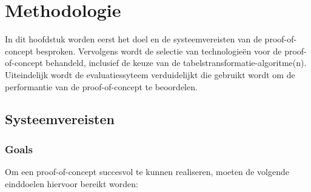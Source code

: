 
\chapter{Methodologie}
\label{ch:methodologie}


In dit hoofdstuk worden eerst het doel en de systeemvereisten van de proof-of-concept besproken. Vervolgens wordt de selectie van technologieën voor de proof-of-concept behandeld, inclusief de keuze van de tabelstransformatie-algoritme(n). Uiteindelijk wordt de evaluatiessyteem verduidelijkt die gebruikt wordt om de performantie van de proof-of-concept te beoordelen.

\section{Systeemvereisten}
\label{sec:systeemvereisten}

\subsection{Goals}

Om een proof-of-concept succesvol te kunnen realiseren, moeten de volgende einddoelen hiervoor bereikt worden:

